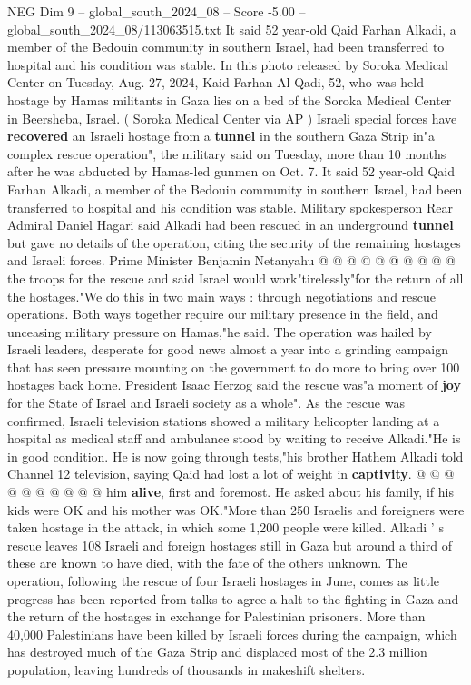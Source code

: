 \begin{textsample}{NEG Dim 9 – global\_south\_2024\_08 – Score -5.00 – global\_south\_2024\_08/113063515.txt}  \label{ex:f9_neg_385}
It said 52 year-old Qaid Farhan Alkadi, a member of the Bedouin community in southern Israel, had been transferred to hospital and his condition was stable.
In this photo released by Soroka Medical Center on Tuesday, Aug. 27, 2024, Kaid Farhan Al-Qadi, 52, who was held hostage by Hamas militants in Gaza lies on a bed of the Soroka Medical Center in Beersheba, Israel. ( Soroka Medical Center via AP ) Israeli special forces have \textbf{recovered} an Israeli hostage from a \textbf{tunnel} in the southern Gaza Strip in"a complex rescue operation", the military said on Tuesday, more than 10 months after he was abducted by Hamas-led gunmen on Oct. 7.
It said 52 year-old Qaid Farhan Alkadi, a member of the Bedouin community in southern Israel, had been transferred to hospital and his condition was stable.
Military spokesperson Rear Admiral Daniel Hagari said Alkadi had been rescued in an underground \textbf{tunnel} but gave no details of the operation, citing the security of the remaining hostages and Israeli forces.
Prime Minister Benjamin Netanyahu @ @ @ @ @ @ @ @ @ @ the troops for the rescue and said Israel would work"tirelessly"for the return of all the hostages."We do this in two main ways : through negotiations and rescue operations.
Both ways together require our military presence in the field, and unceasing military pressure on Hamas,"he said.
The operation was hailed by Israeli leaders, desperate for good news almost a year into a grinding campaign that has seen pressure mounting on the government to do more to bring over 100 hostages back home.
President Isaac Herzog said the rescue was"a moment of \textbf{joy} for the State of Israel and Israeli society as a whole".
As the rescue was confirmed, Israeli television stations showed a military helicopter landing at a hospital as medical staff and ambulance stood by waiting to receive Alkadi."He is in good condition.
He is now going through tests,"his brother Hathem Alkadi told Channel 12 television, saying Qaid had lost a lot of weight in \textbf{captivity}. @ @ @ @ @ @ @ @ @ @ him \textbf{alive}, first and foremost.
He asked about his family, if his kids were OK and his mother was OK."More than 250 Israelis and foreigners were taken hostage in the attack, in which some 1,200 people were killed.
Alkadi ' s rescue leaves 108 Israeli and foreign hostages still in Gaza but around a third of these are known to have died, with the fate of the others unknown.
The operation, following the rescue of four Israeli hostages in June, comes as little progress has been reported from talks to agree a halt to the fighting in Gaza and the return of the hostages in exchange for Palestinian prisoners.
More than 40,000 Palestinians have been killed by Israeli forces during the campaign, which has destroyed much of the Gaza Strip and displaced most of the 2.3 million population, leaving hundreds of thousands in makeshift shelters.

\end{textsample}

